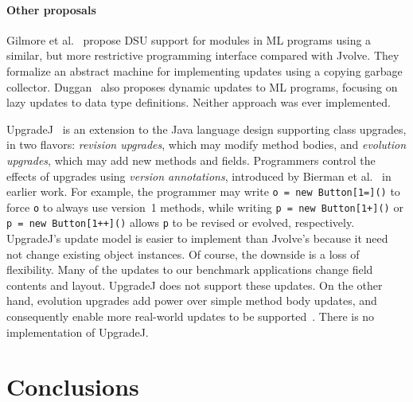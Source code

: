 \documentclass[9pt]{sigplanconf}
\newcommand{\DSU}{{\sc Jvolve}}
\begin{document}
\paragraph*{Other proposals}

Gilmore et al.~\cite{GilmoreKW97} propose DSU support for modules in
ML programs using a similar, but more restrictive programming interface
compared with \DSU{}.  They formalize an abstract machine for
implementing updates using a copying garbage collector.
Duggan~\cite{DBLP:journals/acta/Duggan05} also proposes dynamic
updates to ML programs, focusing on lazy updates to data type
definitions.  Neither approach was ever implemented.

UpgradeJ~\cite{bierman08upgradej} is an extension to
the Java language design supporting class upgrades, in two flavors:
\emph{revision upgrades}, which may modify method bodies, and
\emph{evolution upgrades}, which may add new methods and fields.
Programmers control the effects of upgrades using \emph{version
annotations}, introduced by Bierman et al.~\cite{BiermanHSS03} in
earlier work.  For 
example, the programmer may write \texttt{o = new 
Button[1=]()} to force \texttt{o} to always use version~1 methods,
while writing \texttt{p = new Button[1+]()} or \texttt{p = new
  Button[1++]()} allows \texttt{p} to be revised or evolved,
respectively.  UpgradeJ's update model is easier to implement than
\DSU's because it need not change existing object instances.  Of
course, the downside is a loss of flexibility.  Many of the updates to
our benchmark applications change field contents and layout.  UpgradeJ does not support these updates.  On the other hand,
evolution upgrades add power over simple method
body updates, and consequently enable more real-world updates to be
supported~\cite{tempero08upgradej}.  There is no implementation of
UpgradeJ.








\section{Conclusions}
\label{sec:conc}
\end{document}
